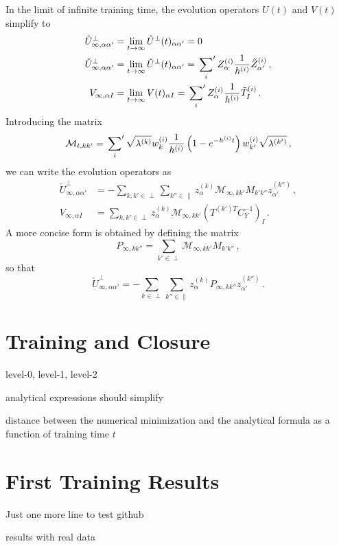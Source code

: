 \documentclass[11pt]{article}
\begin{document}
In the limit of infinite training time, the evolution operators $U(t)$ and $V(t)$ simplify to
\begin{align}
    \hat{U}^\perp_{\infty, \alpha\alpha'}
        &= \lim_{t\to\infty}\hat{U}^\perp(t)_{\alpha\alpha'} = 0\, \\
    \check{U}^\perp_{\infty,\alpha\alpha'}
        &= \lim_{t\to\infty}\check{U}^\perp(t)_{\alpha\alpha'}
            = \sideset{}{'}\sum_{i} Z^{(i)}_{\alpha} \frac{1}{h^{(i)}} \tilde{Z}^{(i)}_{\alpha'}\, , \\
    V_{\infty,\alpha I}
        &= \lim_{t\to\infty}V(t)_{\alpha I}
            = \sideset{}{'}\sum_{i} Z^{(i)}_{\alpha} \frac{1}{h^{(i)}} \tilde{T}^{(i)}_{I}\, .
\end{align}
Introducing the matrix
\begin{align}
    \label{eq:calMDef}
    \mathcal{M}_{t,kk'}
        = \sideset{}{'}\sum_{i} \sqrt{\lambda^{(k)}} w^{(i)}_{k} \frac{1}{h^{(i)}}
            \left(1 - e^{-h^{(i)}t}\right) w^{(i)}_{k'} \sqrt{\lambda^{(k')}} \, ,
\end{align}
we can write the evolution operators as
\begin{align}
    \label{eq:UcheckInfty}
    \check{U}^\perp_{\infty,\alpha\alpha'}
        &= -\sum_{k,k'\in\perp} \sum_{k''\in\parallel} z^{(k)}_{\alpha} \mathcal{M}_{\infty,kk'} M_{k'k''} z^{(k'')}_{\alpha'}\, , \\
    \label{eq:VInfty}
    V_{\infty, \alpha I}
        &= \sum_{k,k'\in\perp} z^{(k)}_{\alpha} \mathcal{M}_{\infty,kk'}
            \left(T^{(k') T} C_{Y}^{-1}\right)_I \, .
\end{align}
A more concise form is obtained by defining the matrix
\begin{equation}
    \label{eq:PInftyDef}
    P_{\infty,kk''} = \sum_{k'\in\perp} \mathcal{M}_{\infty,kk'} M_{k'k''}\, ,
\end{equation}
so that
\begin{equation}
    \label{eq:UcheckInftyV2}
    \check{U}^\perp_{\infty,\alpha\alpha'} = -\sum_{k\in\perp} \sum_{k''\in\parallel} z^{(k)}_{\alpha} P_{\infty,kk''} z^{(k'')}_{\alpha'}\, .
\end{equation}


\newpage


\section{Training and Closure}

level-0, level-1, level-2

analytical expressions should simplify

distance between the numerical minimization and the analytical formula as a function of
training time $t$

\newpage


\section{First Training Results}

Just one more line to test github

 results with real data



\end{document}
